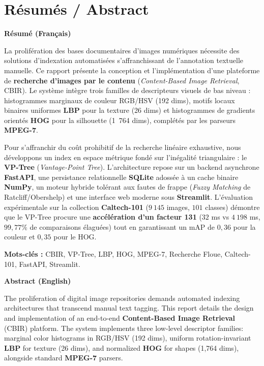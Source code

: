 \documentclass[11pt,a4paper,oneside]{report}
\theoremstyle{definition}
\begin{document}
\vspace{0.5cm}

\chapter*{Résumés / Abstract}

\textbf{\large Résumé (Français)}

La prolifération des bases documentaires d'images numériques nécessite des solutions d'indexation automatisées s'affranchissant de l'annotation textuelle manuelle. Ce rapport présente la conception et l'implémentation d'une plateforme de \textbf{recherche d'images par le contenu} (\textit{Content-Based Image Retrieval}, CBIR). Le système intègre trois familles de descripteurs visuels de bas niveau : histogrammes marginaux de couleur RGB/HSV (192 dims), motifs locaux binaires uniformes \textbf{LBP} pour la texture (26 dims) et histogrammes de gradients orientés \textbf{HOG} pour la silhouette (1~764 dims), complétés par les parseurs \textbf{MPEG-7}.

Pour s'affranchir du coût prohibitif de la recherche linéaire exhaustive, nous développons un index en espace métrique fondé sur l'inégalité triangulaire : le \textbf{VP-Tree} (\textit{Vantage-Point Tree}). L'architecture repose sur un backend asynchrone \textbf{FastAPI}, une persistance relationnelle \textbf{SQLite} adossée à un cache binaire \textbf{NumPy}, un moteur hybride tolérant aux fautes de frappe (\textit{Fuzzy Matching} de Ratcliff/Obershelp) et une interface web moderne sous \textbf{Streamlit}. L'évaluation expérimentale sur la collection \textbf{Caltech-101} ($9~145$ images, $101$ classes) démontre que le VP-Tree procure une \textbf{accélération d'un facteur 131} ($32$ ms vs $4~198$ ms, $99{,}77\%$ de comparaisons élaguées) tout en garantissant un mAP de $0{,}36$ pour la couleur et $0{,}35$ pour le HOG.

\vspace{0.4cm}
\textbf{Mots-clés :} CBIR, VP-Tree, LBP, HOG, MPEG-7, Recherche Floue, Caltech-101, FastAPI, Streamlit.

\vspace{0.8cm}
\textbf{\large Abstract (English)}

The proliferation of digital image repositories demands automated indexing architectures that transcend manual text tagging. This report details the design and implementation of an end-to-end \textbf{Content-Based Image Retrieval} (CBIR) platform. The system implements three low-level descriptor families: marginal color histograms in RGB/HSV (192 dims), uniform rotation-invariant \textbf{LBP} for texture (26 dims), and normalized \textbf{HOG} for shapes (1,764 dims), alongside standard \textbf{MPEG-7} parsers.
\end{document}
